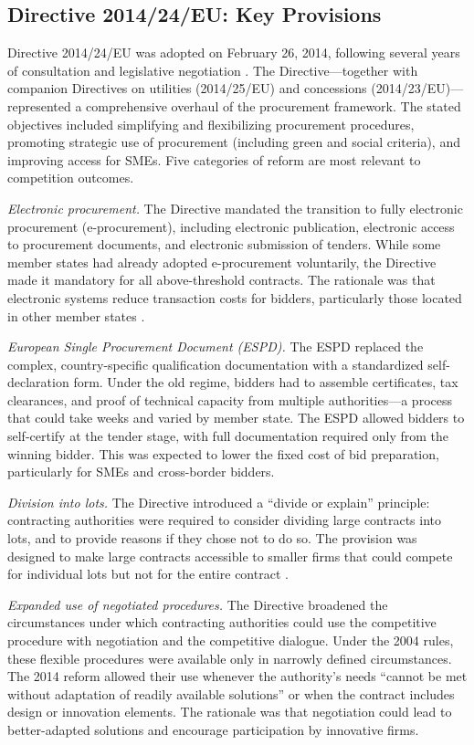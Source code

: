 \documentclass[12pt]{article}
\begin{document}
\subsection{Directive 2014/24/EU: Key Provisions}

Directive 2014/24/EU was adopted on February 26, 2014, following several years of consultation and legislative negotiation \citep{directive201424}. The Directive---together with companion Directives on utilities (2014/25/EU) and concessions (2014/23/EU)---represented a comprehensive overhaul of the procurement framework. The stated objectives included simplifying and flexibilizing procurement procedures, promoting strategic use of procurement (including green and social criteria), and improving access for SMEs. Five categories of reform are most relevant to competition outcomes.

\textit{Electronic procurement.} The Directive mandated the transition to fully electronic procurement (e-procurement), including electronic publication, electronic access to procurement documents, and electronic submission of tenders. While some member states had already adopted e-procurement voluntarily, the Directive made it mandatory for all above-threshold contracts. The rationale was that electronic systems reduce transaction costs for bidders, particularly those located in other member states \citep{albano2006}.

\textit{European Single Procurement Document (ESPD).} The ESPD replaced the complex, country-specific qualification documentation with a standardized self-declaration form. Under the old regime, bidders had to assemble certificates, tax clearances, and proof of technical capacity from multiple authorities---a process that could take weeks and varied by member state. The ESPD allowed bidders to self-certify at the tender stage, with full documentation required only from the winning bidder. This was expected to lower the fixed cost of bid preparation, particularly for SMEs and cross-border bidders.

\textit{Division into lots.} The Directive introduced a ``divide or explain'' principle: contracting authorities were required to consider dividing large contracts into lots, and to provide reasons if they chose not to do so. The provision was designed to make large contracts accessible to smaller firms that could compete for individual lots but not for the entire contract \citep{bergmanLundberg2013}.

\textit{Expanded use of negotiated procedures.} The Directive broadened the circumstances under which contracting authorities could use the competitive procedure with negotiation and the competitive dialogue. Under the 2004 rules, these flexible procedures were available only in narrowly defined circumstances. The 2014 reform allowed their use whenever the authority's needs ``cannot be met without adaptation of readily available solutions'' or when the contract includes design or innovation elements. The rationale was that negotiation could lead to better-adapted solutions and encourage participation by innovative firms.
\end{document}
